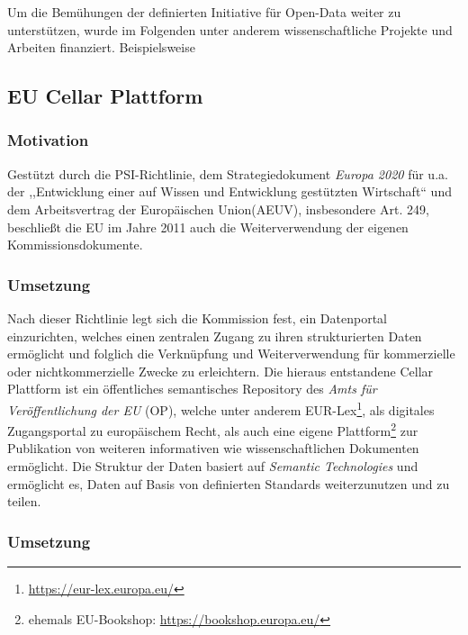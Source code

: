 Um die Bemühungen der definierten Initiative für Open-Data weiter zu unterstützen, wurde im Folgenden unter anderem wissenschaftliche Projekte und Arbeiten finanziert.
Beispielsweise 



        
        \pagebreak
        \subsection{EU Cellar Plattform}

        \subsubsection{Motivation}
        
Gestützt durch die PSI-Richtlinie, dem Strategiedokument \textit{Europa 2020} für u.a. der ,,Entwicklung einer auf Wissen und Entwicklung gestützten Wirtschaft`` und dem Arbeitsvertrag der Europäischen Union(AEUV), insbesondere Art. 249, beschließt die EU im Jahre 2011 auch die Weiterverwendung der eigenen Kommissionsdokumente.\cite[Prä. 1]{2011D0833}

        \subsubsection{Umsetzung}

Nach dieser Richtlinie legt sich die Kommission fest, ein Datenportal einzurichten, welches einen zentralen Zugang zu ihren strukturierten Daten ermöglicht und folglich die Verknüpfung und Weiterverwendung für kommerzielle oder nichtkommerzielle Zwecke zu erleichtern. \cite[Art. 5]{2011D0833}
Die hieraus entstandene Cellar Plattform ist ein öffentliches semantisches Repository des \textit{Amts für Veröffentlichung der EU} (OP), welche unter anderem EUR-Lex\footnote{\href{https://eur-lex.europa.eu/homepage.html?locale=de}{https://eur-lex.europa.eu/}}, als digitales Zugangsportal zu europäischem Recht, als auch eine eigene Plattform\footnote{ehemals EU-Bookshop: \href{https://bookshop.europa.eu/}{https://bookshop.europa.eu/}} zur Publikation von weiteren informativen wie wissenschaftlichen Dokumenten ermöglicht.
Die Struktur der Daten basiert auf \textit{Semantic Technologies} und ermöglicht es, Daten auf Basis von definierten Standards weiterzunutzen und zu teilen. 
\cite[5]{eu_cellar}

        \subsubsection{Umsetzung}

